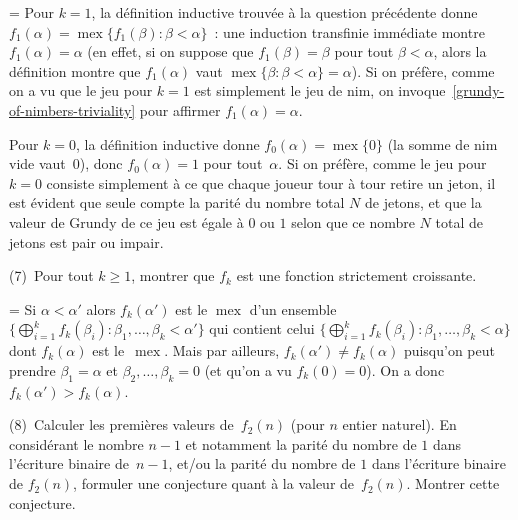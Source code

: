 \documentclass[12pt,a4paper]{article}
\theoremstyle{definition}
\newcommand{\mex}{\operatorname{mex}}
\newif\ifcorrige
\newenvironment{corrige}%
{\ifcorrige\relax\else\setbox0=\vbox\bgroup\fi%
\smallbreak\noindent{\underbar{\textit{Corrigé.}}\quad}}
{{\hbox{}\nobreak\hfill\checkmark}%
\ifcorrige\relax\else\egroup\fi\par}
\begin{document}
\begin{corrige}
Pour $k=1$, la définition inductive trouvée à la question précédente
donne $f_1(\alpha) = \mex\{f_1(\beta) : \beta<\alpha\}$ : une
induction transfinie immédiate montre $f_1(\alpha) = \alpha$ (en
effet, si on suppose que $f_1(\beta) = \beta$ pour tout
$\beta<\alpha$, alors la définition montre que $f_1(\alpha)$ vaut
$\mex\{\beta : \beta<\alpha\} = \alpha$).  Si on préfère, comme on a
vu que le jeu pour $k=1$ est simplement le jeu de nim, on
invoque \ref{grundy-of-nimbers-triviality} pour affirmer $f_1(\alpha)
= \alpha$.

Pour $k=0$, la définition inductive donne $f_0(\alpha) = \mex\{0\}$
(la somme de nim vide vaut $0$), donc $f_0(\alpha) = 1$ pour
tout $\alpha$.  Si on préfère, comme le jeu pour $k=0$ consiste
simplement à ce que chaque joueur tour à tour retire un jeton, il est
évident que seule compte la parité du nombre total $N$ de jetons, et
que la valeur de Grundy de ce jeu est égale à $0$ ou $1$ selon que ce
nombre $N$ total de jetons est pair ou impair.
\end{corrige}

\smallbreak

(7) Pour tout $k\geq 1$, montrer que $f_k$ est une fonction
strictement croissante.

\begin{corrige}
Si $\alpha < \alpha'$ alors $f_k(\alpha')$ est le $\mex$ d'un ensemble
$\{\bigoplus_{i=1}^k f_k(\beta_i) : \beta_1,\ldots,\beta_k <
\alpha'\}$ qui contient celui $\{\bigoplus_{i=1}^k f_k(\beta_i) :
\beta_1,\ldots,\beta_k < \alpha\}$ dont $f_k(\alpha)$ est le $\mex$.
Mais par ailleurs, $f_k(\alpha') \neq f_k(\alpha)$ puisqu'on peut
prendre $\beta_1 = \alpha$ et $\beta_2,\ldots,\beta_k = 0$ (et qu'on a
vu $f_k(0) = 0$).  On a donc $f_k(\alpha') > f_k(\alpha)$.
\end{corrige}

\smallbreak

(8) Calculer les premières valeurs de $f_2(n)$ (pour $n$ entier
naturel).  En considérant le nombre $n-1$ et notamment la parité du
nombre de $1$ dans l'écriture binaire de $n-1$, et/ou la parité du
nombre de $1$ dans l'écriture binaire de $f_2(n)$, formuler une
conjecture quant à la valeur de $f_2(n)$.  Montrer cette conjecture.
\end{document}
